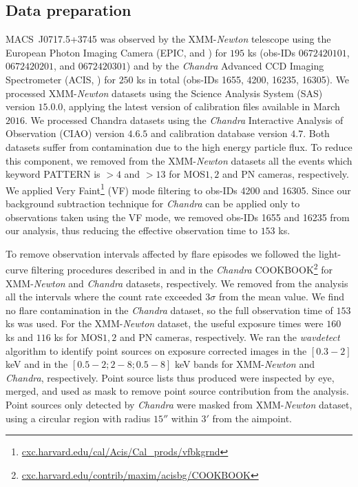 \documentclass[twocolumn,traditabstract]{aa}
\begin{document}
\subsection{Data preparation}
\mbox{MACS~J0717.5+3745} was observed by the XMM-\textit{Newton} telescope using the European Photon Imaging Camera (EPIC, \citealt{turner2001} and \citealt{struder2001}) for $195$ ks (obs-IDs $0672420101$, $0672420201$, and $0672420301$) and by the \textit{Chandra} Advanced CCD Imaging Spectrometer (ACIS, \citealt{garmire2003}) for $250$ ks in total (obs-IDs 1655, 4200, 16235, 16305). We processed XMM-\textit{Newton} datasets using the Science Analysis System (SAS) version $15.0.0$, applying the latest version of calibration files available in March $2016$. We processed Chandra datasets using the \textit{Chandra} Interactive Analysis of Observation (CIAO) version $4.6.5$ and calibration database version $4.7$. Both datasets suffer from contamination due to the high energy particle flux. To reduce this component, we removed from the XMM-\textit{Newton} datasets all the events which keyword PATTERN is $>4$ and $>13$ for MOS$1,2$ and PN cameras, respectively. We applied Very Faint\footnote{\url{cxc.harvard.edu/cal/Acis/Cal\_prods/vfbkgrnd}} (VF) mode filtering to obs-IDs 4200 and 16305. Since our background subtraction technique for \textit{Chandra} can be applied only to observations taken using the VF mode, we removed obs-IDs 1655 and 16235 from our analysis, thus reducing the effective observation time to $153$ ks.
 
To remove observation intervals affected by flare episodes we followed the light-curve filtering procedures described in \cite{pratt2007} and in the \textit{Chandra} COOKBOOK\footnote{\url{cxc.harvard.edu/contrib/maxim/acisbg/COOKBOOK}} for XMM-\textit{Newton} and \textit{Chandra} datasets, respectively. We removed from the analysis all the intervals where the count rate exceeded $3\sigma$ from the mean value. We find no flare contamination in the \textit{Chandra} dataset, so the full observation time of $153$ ks was used. For the XMM-\textit{Newton} dataset, the useful exposure times were $160$ ks and $116$ ks for MOS$1,2$ and PN cameras, respectively. We ran the \textit{wavdetect} algorithm \citep{freeman2002} to identify point sources on exposure corrected images in the $[0.3-2]$ keV and in the $[0.5-2 ; 2-8 ; 0.5-8]$ keV bands for XMM-\textit{Newton} and \textit{Chandra}, respectively. Point source lists thus produced were inspected by eye, merged, and used as mask to remove point source contribution from the analysis. Point sources only detected by \textit{Chandra} were masked from XMM-\textit{Newton} dataset, using a circular region with radius $15''$ within $3'$ from the aimpoint.
\end{document}
